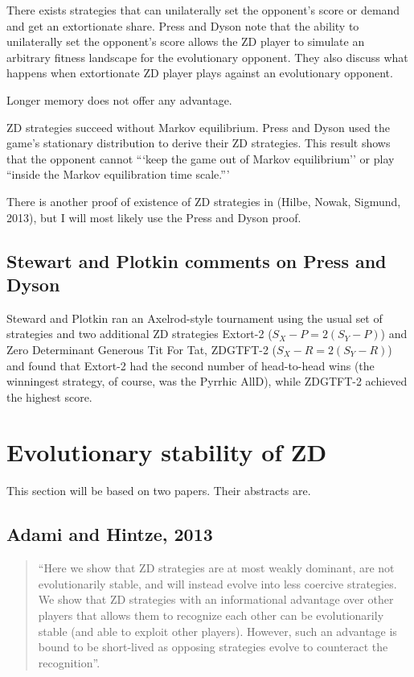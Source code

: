 \begin{theorem}
There exists strategies that can unilaterally set the opponent's score or demand and get an extortionate share. Press and Dyson note that the ability to unilaterally set the opponent's score allows the ZD player to simulate an arbitrary fitness landscape for the evolutionary opponent. They also discuss what happens when extortionate ZD player plays against an evolutionary opponent. 
\end{theorem}
\begin{theorem}
Longer memory does not offer any advantage.
\end{theorem}
\begin{theorem}
ZD strategies succeed without Markov equilibrium. Press and Dyson used the game's stationary distribution to derive their ZD strategies. This result shows that the opponent cannot  ```keep the game out of Markov equilibrium'' or play ``inside the Markov equilibration time scale.'''
\end{theorem}


There is another proof of existence of ZD strategies in (Hilbe, Nowak, Sigmund, 2013), but I will most likely use the Press and Dyson proof.

\subsection{Stewart and Plotkin comments on Press and Dyson}
Steward and Plotkin ran an Axelrod-style tournament using the usual set of strategies and two additional ZD strategies Extort-2 ($S_X - P = 2(S_Y - P)$) and Zero Determinant Generous Tit For Tat, ZDGTFT-2 ($S_X - R = 2(S_Y - R)$) and found that Extort-2 had the second number of head-to-head wins (the winningest strategy, of course, was the Pyrrhic AllD), while ZDGTFT-2 achieved the highest score.


\section{Evolutionary stability of ZD}
This section will be based on two papers. Their abstracts are.
\subsection{Adami and Hintze, 2013}
\begin{quote}``Here we show that ZD strategies are at most weakly dominant, are not evolutionarily stable, and will instead evolve into less coercive strategies. We show that ZD strategies with an informational advantage over other players that allows them to recognize each other can be evolutionarily stable (and able to exploit other players). However, such an advantage is bound to be short-lived as opposing strategies evolve to counteract the recognition''.
\end{quote}

